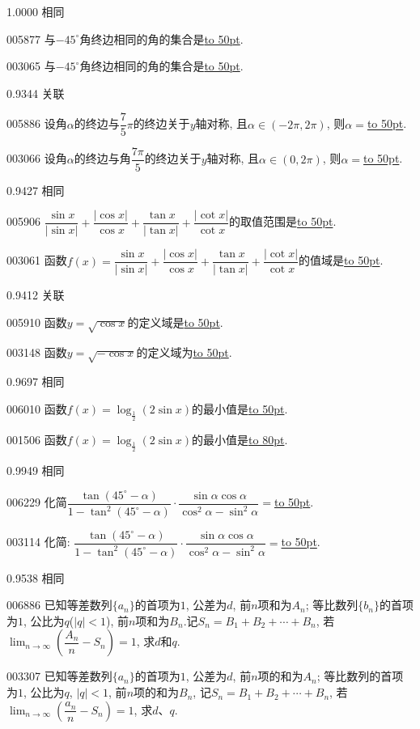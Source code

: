 \documentclass[10pt,a4paper]{article}
\newcommand{\blank}[1]{\underline{\hbox to #1pt{}}}
\begin{document}
1.0000 相同

005877	与$-45^\circ$角终边相同的角的集合是\blank{50}.

003065	与$-45^\circ$角终边相同的角的集合是\blank{50}.



0.9344 关联

005886	设角$\alpha$的终边与$\dfrac 75\pi$的终边关于$y$轴对称, 且$\alpha \in (-2\pi ,2\pi)$, 则$\alpha =$\blank{50}.

003066	设角$\alpha$的终边与角$\dfrac{7\pi}5$的终边关于$y$轴对称, 且$\alpha\in (0,2\pi)$, 则$\alpha=$\blank{50}.



0.9427 相同

005906	$\dfrac{\sin x}{|\sin x|}+\dfrac{|\cos x|}{\cos x}+\dfrac{\tan x}{|\tan x|}+\dfrac{|\cot x|}{\cot x}$的取值范围是\blank{50}.

003061	函数$f(x)=\dfrac{\sin x}{|\sin x|}+\dfrac{|\cos x|}{\cos x}+\dfrac{\tan x}{|\tan x|}+\dfrac{|\cot x|}{\cot x}$的值域是\blank{50}.



0.9412 关联

005910	函数$y=\sqrt {\cos x}$的定义域是\blank{50}.

003148	函数$y=\sqrt{-\cos x}$的定义域为\blank{50}.



0.9697 相同

006010	函数$f(x)=\log _{\frac 12}(2\sin x)$的最小值是\blank{50}.

001506	函数$f(x)=\log_{\frac{1}{2}} (2\sin x)$的最小值是\blank{80}.



0.9949 相同

006229	化简$\dfrac{\tan (45^\circ -\alpha)}{1-\tan ^2(45^\circ -\alpha)}\cdot \dfrac{\sin \alpha \cos \alpha}{\cos ^2\alpha -\sin ^2\alpha}=$\blank{50}.

003114	化简: $\dfrac{\tan (45^\circ-\alpha)}{1-\tan^2(45^\circ-\alpha)}\cdot \dfrac{\sin \alpha \cos \alpha}{\cos^2\alpha -\sin ^2\alpha}=$\blank{50}.



0.9538 相同

006886	已知等差数列$\{a_n\}$的首项为$1$, 公差为$d$, 前$n$项和为$A_n$; 等比数列$\{b_n\}$的首项为$1$, 公比为$q$($|q|<1$), 前$n$项和为$B_n$.记$S_n=B_1+B_2+\cdots +B_n$, 若$\displaystyle \lim_{n\to \infty} (\dfrac{A_n}n-S_n)=1$, 求$d$和$q$.

003307	已知等差数列$\{a_n\}$的首项为$1$, 公差为$d$, 前$n$项的和为$A_n$; 等比数列的首项为$1$, 公比为$q$, $|q|<1$, 前$n$项的和为$B_n$, 记$S_n=B_1+B_2+\cdots+B_n$, 若$\displaystyle\lim_{n\to \infty}(\dfrac{a_n}n-S_n)=1$, 求$d$、$q$.
\end{document}
